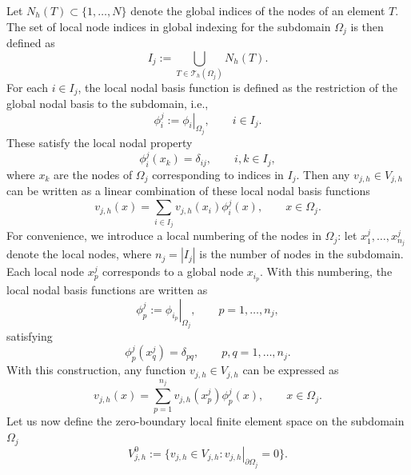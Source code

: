 \documentclass[a4paper, 11pt]{article}
\theoremstyle{remark}
\begin{document}
Let $N_{h}(T)\subset\{1, \ldots, N\}$ denote the global indices of the nodes of an element $T$. The set of local node indices in global indexing for 
the subdomain $\Omega_{j}$ is then defined as
\begin{equation*}
    I_{j} := \bigcup_{T\in\mathcal{T}_{h}(\Omega_{j})}N_{h}(T).
\end{equation*}
For each $i\in I_{j}$, the local nodal basis function is defined as the restriction of the global nodal basis to the subdomain, i.e.,
\begin{equation*}
    \phi_{i}^{j} := \left.\phi_{i}\right|_{\Omega_{j}}, \qquad i\in I_{j}.
\end{equation*}
These satisfy the local nodal property
\begin{equation*}
    \phi_{i}^{j}(x_{k}) = \delta_{ij}, \qquad i, k \in I_{j},
\end{equation*}
where $x_{k}$ are the nodes of $\Omega_{j}$ corresponding to indices in $I_{j}$. Then any $v_{j, h}\in V_{j, h}$ can be written as a linear combination of these local nodal basis functions
\begin{equation*}
    v_{j, h}(x) = \sum_{i\in I_{j}}v_{j, h}(x_{i})\phi_{i}^{j}(x), \qquad x\in \Omega_{j}.
\end{equation*}
For convenience, we introduce a local numbering of the nodes in $\Omega_{j}$: let $x^{j}_{1}, \ldots, x^{j}_{n_{j}}$ denote the local nodes, where $n_{j} = |I_{j}|$ is the number of nodes in the subdomain. Each local node $x_{p}^{j}$ corresponds to a global node $x_{i_{p}}$. With this numbering, the local nodal basis functions are written as
\begin{equation*}
    \phi_{p}^{j} := \left.\phi_{i_{p}}\right|_{\Omega_{j}}, \qquad p = 1, \ldots, n_{j},
\end{equation*}
satisfying
\begin{equation*}
    \phi_{p}^{j}(x_{q}^{j}) = \delta_{pq}, \qquad p, q = 1, \ldots, n_{j}.
\end{equation*}
With this construction, any function $v_{j, h}\in V_{j, h}$ can be expressed as
\begin{equation*}
    v_{j, h}(x) = \sum_{p=1}^{n_{j}}v_{j, h}(x_{p}^{j})\phi_{p}^{j}(x), \qquad x\in \Omega_{j}.
\end{equation*}
Let us now define the zero-boundary local finite element space on the subdomain $\Omega_{j}$
\begin{equation*}
    V_{j, h}^{0} := \{v_{j, h}\in V_{j, h} : \left.v_{j, h}\right|_{\partial\Omega_{j}} = 0\}.
\end{equation*}
\end{document}
